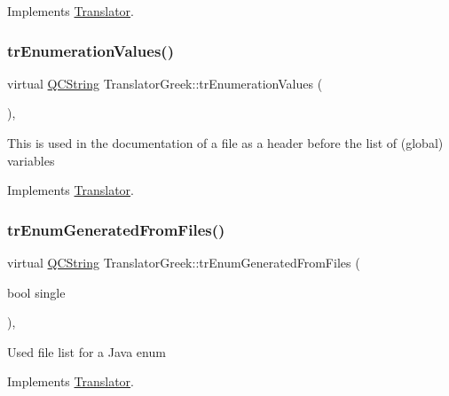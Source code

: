 Implements \mbox{\hyperlink{class_translator}{Translator}}.

\mbox{\label{class_translator_greek_af751a24fe2f3d4fbb39561736b6ae69c}} 
\subsubsection{\texorpdfstring{trEnumerationValues()}{trEnumerationValues()}}
{\footnotesize\ttfamily virtual \mbox{\hyperlink{class_q_c_string}{Q\+C\+String}} Translator\+Greek\+::tr\+Enumeration\+Values (\begin{DoxyParamCaption}{ }\end{DoxyParamCaption})\hspace{0.3cm}{\ttfamily [inline]}, {\ttfamily [virtual]}}

This is used in the documentation of a file as a header before the list of (global) variables 

Implements \mbox{\hyperlink{class_translator}{Translator}}.

\mbox{\label{class_translator_greek_a58e142d40f39efcf9b22a3267cf8619c}} 
\subsubsection{\texorpdfstring{trEnumGeneratedFromFiles()}{trEnumGeneratedFromFiles()}}
{\footnotesize\ttfamily virtual \mbox{\hyperlink{class_q_c_string}{Q\+C\+String}} Translator\+Greek\+::tr\+Enum\+Generated\+From\+Files (\begin{DoxyParamCaption}\item[{bool}]{single }\end{DoxyParamCaption})\hspace{0.3cm}{\ttfamily [inline]}, {\ttfamily [virtual]}}

Used file list for a Java enum 

Implements \mbox{\hyperlink{class_translator}{Translator}}.

\mbox{\label{class_translator_greek_add0bebecd3eb4223e44eb3ebbba3afc1}} 
